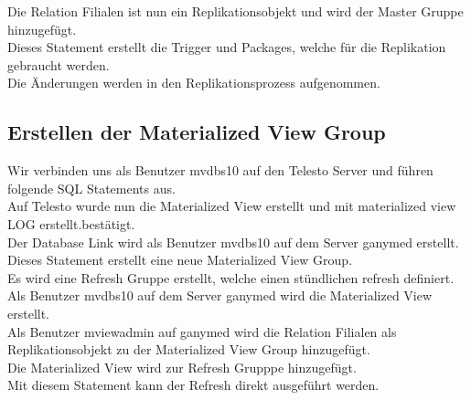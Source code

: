 \documentclass[11pt,a4paper,parskip=half]{scrartcl}
\begin{document}

Die Relation Filialen ist nun ein Replikationsobjekt  und wird der Master Gruppe hinzugefügt. \\


Dieses Statement erstellt die Trigger und Packages, welche für die Replikation gebraucht werden.\\


Die Änderungen werden in den Replikationsprozess aufgenommen.\\

\subsection{Erstellen der Materialized View Group}
Wir verbinden uns als Benutzer mvdbs10 auf den Telesto Server und führen folgende SQL Statements aus.\\


Auf Telesto wurde nun die Materialized View erstellt und mit \glqq materialized view LOG erstellt.\grqq bestätigt.\\


Der Database Link wird als Benutzer mvdbs10 auf dem Server ganymed erstellt.\\


Dieses Statement erstellt eine neue Materialized View Group.\\


Es wird eine Refresh Gruppe erstellt, welche einen stündlichen refresh definiert.\\


Als Benutzer mvdbs10 auf dem Server ganymed wird die Materialized View erstellt.\\


Als Benutzer mviewadmin auf ganymed wird die Relation Filialen als Replikationsobjekt zu der Materialized View Group hinzugefügt.\\


Die Materialized View wird zur Refresh Grupppe hinzugefügt.\\


Mit diesem Statement kann der Refresh direkt ausgeführt werden.\\
\end{document}
